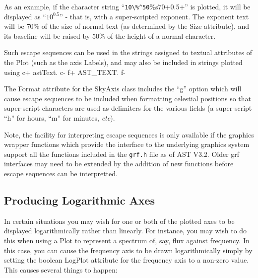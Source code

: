 \documentclass[twoside,11pt]{article}
\begin{document}
As an example, if the character string ``\verb+10\%^50+\%s70+0.5+'' is
plotted, it will be displayed as ``$10^{0.5}$'' - that is, with a
super-scripted exponent. The exponent text will be 70\% of the size of
normal text (as determined by the Size attribute), and its baseline will
be raised by 50\% of the height of a normal character.

Such escape sequences can be used in the strings assigned to textual
attributes of the Plot (such as the axis Labels), and may also be
included in strings plotted using
c+
astText.
c-
f+
AST\_TEXT.
f-

The Format attribute for the SkyAxis class includes the ``g'' option
which will cause escape sequences to be included when formatting
celestial positions so that super-script characters are used as
delimiters for the various fields (a super-script ``h'' for hours, ``m''
for minutes, \emph{etc}).

Note, the facility for interpreting escape sequences is only available if
the graphics wrapper functions which provide the interface to the
underlying graphics system support all the functions included in the
\verb+grf.h+ file as of AST V3.2. Older grf interfaces may need to be
extended by the addition of new functions before escape sequences can be
interpretted.

\subsection{\label{ss:logaxes}Producing Logarithmic Axes}
In certain situations you may wish for one or both of the plotted axes to
be displayed logarithmically rather than linearly. For instance, you may
wish to do this when using a Plot to represent a spectrum of, say, flux
against frequency. In this case, you can cause the frequency axis to be drawn
logarithmically simply by setting the boolean LogPlot attribute for the
frequency axis to a non-zero value. This causes several things to happen:
\end{document}
